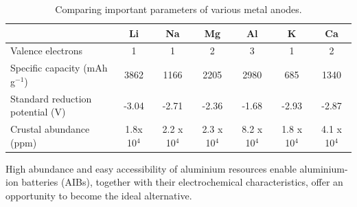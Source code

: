 \begin{table}[tbh!]
\centering
\caption{Comparing important parameters of various metal anodes.} \label{table2}
\begin{tabular}{|p{2cm}cccccc|}
\hline
 & \textbf{Li} & \textbf{Na} & \textbf{Mg} & \textbf{Al} & \textbf{K} & \textbf{Ca}\\
\hline
Valence electrons & 1 & 1 & 2 & 3 & 1 & 2\\
Specific capacity (mAh g$^{-1}$) & 3862 & 1166 & 2205 & 2980 & 685 & 1340\\
Standard reduction potential (V) & -3.04 & -2.71 & -2.36  & -1.68 & -2.93 & -2.87\\
Crustal abundance (ppm) & 1.8x 10$^{4}$ & 2.2 x 10$^{4}$ & 2.3 x 10$^{4}$ & 8.2 x 10$^{4}$ & 1.8 x 10$^{4}$ & 4.1 x 10$^{4}$\\
\hline  %
\end{tabular}
\end{table}

High abundance and easy accessibility of aluminium resources enable aluminium-ion batteries (AIBs), together with their electrochemical characteristics, offer an opportunity to become the ideal alternative.

